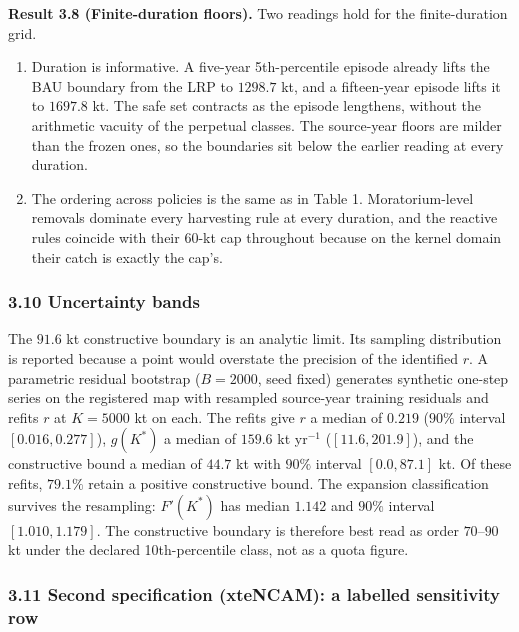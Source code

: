 \documentclass[11pt]{article}
\begin{document}
\textbf{Result 3.8 (Finite-duration floors).} Two readings hold for the
finite-duration grid.

\begin{enumerate}
\def\labelenumi{(\roman{enumi})}
\item
  Duration is informative. A five-year 5th-percentile episode already
  lifts the BAU boundary from the LRP to \(1298.7\) kt, and a
  fifteen-year episode lifts it to \(1697.8\) kt. The safe set contracts
  as the episode lengthens, without the arithmetic vacuity of the
  perpetual classes. The source-year floors are milder than the frozen
  ones, so the boundaries sit below the earlier reading at every
  duration.
\item
  The ordering across policies is the same as in Table 1.
  Moratorium-level removals dominate every harvesting rule at every
  duration, and the reactive rules coincide with their 60-kt cap
  throughout because on the kernel domain their catch is exactly the
  cap's.
\end{enumerate}

\subsubsection{3.10 Uncertainty bands}\label{uncertainty-bands}

The \(91.6\) kt constructive boundary is an analytic limit. Its sampling
distribution is reported because a point would overstate the precision
of the identified \(r\). A parametric residual bootstrap (\(B = 2000\),
seed fixed) generates synthetic one-step series on the registered map
with resampled source-year training residuals and refits \(r\) at
\(K = 5000\) kt on each. The refits give \(r\) a median of \(0.219\)
(\(90\%\) interval \([0.016, 0.277]\)), \(g(K^*)\) a median of \(159.6\)
kt yr\(^{-1}\) (\([11.6, 201.9]\)), and the constructive bound a median
of \(44.7\) kt with \(90\%\) interval \([0.0, 87.1]\) kt. Of these
refits, \(79.1\%\) retain a positive constructive bound. The expansion
classification survives the resampling: \(F'(K^*)\) has median \(1.142\)
and \(90\%\) interval \([1.010, 1.179]\). The constructive boundary is
therefore best read as order \(70\)--\(90\) kt under the declared
10th-percentile class, not as a quota figure.

\subsubsection{3.11 Second specification (xteNCAM): a labelled
sensitivity
row}\label{second-specification-xtencam-a-labelled-sensitivity-row}
\end{document}
